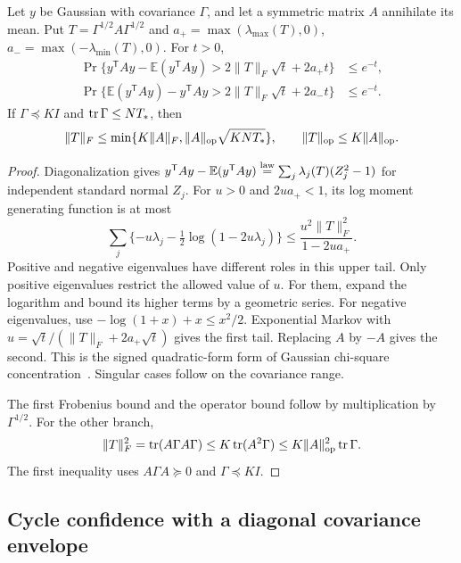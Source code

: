 \begin{lemma}
\label{cc16:gaussian}
Let $y$ be Gaussian with covariance $\Gamma$, and let a symmetric matrix $A$ annihilate its mean. Put $T=\Gamma^{1/2}A\Gamma^{1/2}$ and $a_+=\max(\lambda_{\max}(T),0)$, $a_-=\max(-\lambda_{\min}(T),0)$. For $t>0$,
\begin{align}
 \Pr\{y^{\mathsf T}Ay-\mathbb E(y^{\mathsf T}Ay)
          >2\|T\|_F\sqrt t+2a_+t\}&\le e^{-t},\nonumber\\
 \Pr\{\mathbb E(y^{\mathsf T}Ay)-y^{\mathsf T}Ay
          >2\|T\|_F\sqrt t+2a_-t\}&\le e^{-t}.
 \label{cc16:quadratic-tails}
\end{align}
If $\Gamma\preceq KI$ and $\operatorname{tr}\Gamma\le NT_*$, then
\begin{equation}
 \|T\|_F\le\min\{K\|A\|_F,
              \|A\|_{\rm op}\sqrt{KNT_*}\},
 \qquad \|T\|_{\rm op}\le K\|A\|_{\rm op}.
 \label{cc16:mixed-norm}
\end{equation}
\end{lemma}
\begin{proof}
Diagonalization gives
$y^{\mathsf T}Ay-\mathbb E(y^{\mathsf T}Ay)
\stackrel{\rm law}=\sum_j\lambda_j(T)(Z_j^2-1)$
for independent standard normal $Z_j$. For $u>0$ and $2ua_+<1$, its log moment generating function is at most
\[
 \sum_j\{-u\lambda_j-\tfrac12\log(1-2u\lambda_j)\}
 \le\frac{u^2\|T\|_F^2}{1-2ua_+}.
\]
Positive and negative eigenvalues have different roles in this upper tail. Only positive eigenvalues restrict the allowed value of $u$. For them, expand the logarithm and bound its higher terms by a geometric series. For negative eigenvalues, use $-\log(1+x)+x\le x^2/2$. Exponential Markov with $u=\sqrt t/(\|T\|_F+2a_+\sqrt t)$ gives the first tail. Replacing $A$ by $-A$ gives the second. This is the signed quadratic-form form of Gaussian chi-square concentration~\cite{laurentmassart}. Singular cases follow on the covariance range.

The first Frobenius bound and the operator bound follow by multiplication by $\Gamma^{1/2}$. For the other branch,
\[
 \|T\|_F^2=\operatorname{tr}(A\Gamma A\Gamma)
 \le K\operatorname{tr}(A^2\Gamma)
 \le K\|A\|_{\rm op}^2\operatorname{tr}\Gamma.
\]
The first inequality uses $A\Gamma A\succeq0$ and $\Gamma\preceq KI$.
\end{proof}

\subsection{Cycle confidence with a diagonal covariance envelope}

